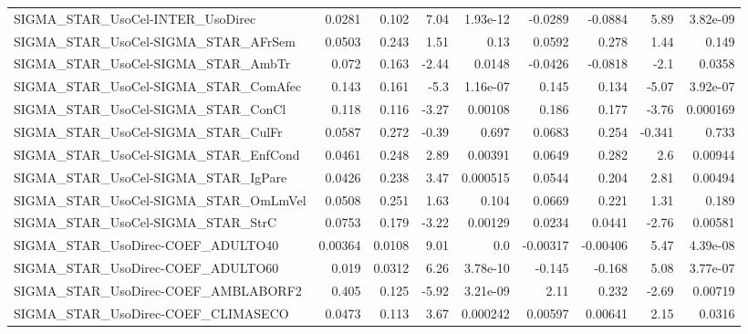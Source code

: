 \begin{tabular}{lrrrrrrrr}
SIGMA\_STAR\_UsoCel-INTER\_UsoDirec       &      0.0281 &        0.102 &    7.04 & 1.93e-12 &    -0.0289 &     -0.0884 &         5.89 &      3.82e-09 \\
SIGMA\_STAR\_UsoCel-SIGMA\_STAR\_AFrSem    &      0.0503 &        0.243 &    1.51 &     0.13 &     0.0592 &       0.278 &         1.44 &         0.149 \\
SIGMA\_STAR\_UsoCel-SIGMA\_STAR\_AmbTr     &       0.072 &        0.163 &   -2.44 &   0.0148 &    -0.0426 &     -0.0818 &         -2.1 &        0.0358 \\
SIGMA\_STAR\_UsoCel-SIGMA\_STAR\_ComAfec   &       0.143 &        0.161 &    -5.3 & 1.16e-07 &      0.145 &       0.134 &        -5.07 &      3.92e-07 \\
SIGMA\_STAR\_UsoCel-SIGMA\_STAR\_ConCl     &       0.118 &        0.116 &   -3.27 &  0.00108 &      0.186 &       0.177 &        -3.76 &      0.000169 \\
SIGMA\_STAR\_UsoCel-SIGMA\_STAR\_CulFr     &      0.0587 &        0.272 &   -0.39 &    0.697 &     0.0683 &       0.254 &       -0.341 &         0.733 \\
SIGMA\_STAR\_UsoCel-SIGMA\_STAR\_EnfCond   &      0.0461 &        0.248 &    2.89 &  0.00391 &     0.0649 &       0.282 &          2.6 &       0.00944 \\
SIGMA\_STAR\_UsoCel-SIGMA\_STAR\_IgPare    &      0.0426 &        0.238 &    3.47 & 0.000515 &     0.0544 &       0.204 &         2.81 &       0.00494 \\
SIGMA\_STAR\_UsoCel-SIGMA\_STAR\_OmLmVel   &      0.0508 &        0.251 &    1.63 &    0.104 &     0.0669 &       0.221 &         1.31 &         0.189 \\
SIGMA\_STAR\_UsoCel-SIGMA\_STAR\_StrC      &      0.0753 &        0.179 &   -3.22 &  0.00129 &     0.0234 &      0.0441 &        -2.76 &       0.00581 \\
SIGMA\_STAR\_UsoDirec-COEF\_ADULTO40      &     0.00364 &       0.0108 &    9.01 &      0.0 &   -0.00317 &    -0.00406 &         5.47 &      4.39e-08 \\
SIGMA\_STAR\_UsoDirec-COEF\_ADULTO60      &       0.019 &       0.0312 &    6.26 & 3.78e-10 &     -0.145 &      -0.168 &         5.08 &      3.77e-07 \\
SIGMA\_STAR\_UsoDirec-COEF\_AMBLABORF2    &       0.405 &        0.125 &   -5.92 & 3.21e-09 &       2.11 &       0.232 &        -2.69 &       0.00719 \\
SIGMA\_STAR\_UsoDirec-COEF\_CLIMASECO     &      0.0473 &        0.113 &    3.67 & 0.000242 &    0.00597 &     0.00641 &         2.15 &        0.0316 \\

\end{tabular}
